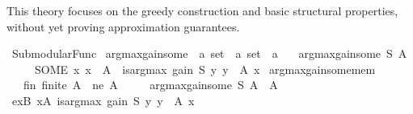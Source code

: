 \begin{isabellebody}
\begin{isamarkuptext}
  This theory focuses on the greedy construction and basic structural
  properties, without yet proving approximation guarantees.%
\end{isamarkuptext}\isamarkuptrue%
%
\isadelimdocument
%
\endisadelimdocument
%
\isatagdocument
%
\isamarkuptrue%
%
\endisatagdocument
{\isafolddocument}%
%
\isadelimdocument
%
\endisadelimdocument
{}\isamarkupfalse%
\ Submodular{\isacharunderscore}{\kern0pt}Func\isanewline
{}\isanewline
\isanewline
{}\isamarkupfalse%
\ argmax{\isacharunderscore}{\kern0pt}gain{\isacharunderscore}{\kern0pt}some\ {\isacharcolon}{\kern0pt}{\isacharcolon}{\kern0pt}\ {\isachardoublequoteopen}{\isacharprime}{\kern0pt}a\ set\ {\isasymRightarrow}\ {\isacharprime}{\kern0pt}a\ set\ {\isasymRightarrow}\ {\isacharprime}{\kern0pt}a{\isachardoublequoteclose}\ \isanewline
\ \ {\isachardoublequoteopen}argmax{\isacharunderscore}{\kern0pt}gain{\isacharunderscore}{\kern0pt}some\ S\ A\ {\isacharequal}{\kern0pt}\isanewline
\ \ \ \ \ {\isacharparenleft}{\kern0pt}SOME\ x{\isachardot}{\kern0pt}\ x\ {\isasymin}\ A\ {\isasymand}\ is{\isacharunderscore}{\kern0pt}arg{\isacharunderscore}{\kern0pt}max\ {\isacharparenleft}{\kern0pt}gain\ S{\isacharparenright}{\kern0pt}\ {\isacharparenleft}{\kern0pt}{\isasymlambda}y{\isachardot}{\kern0pt}\ y\ {\isasymin}\ A{\isacharparenright}{\kern0pt}\ x{\isacharparenright}{\kern0pt}{\isachardoublequoteclose}\isanewline
\isanewline
{}\isamarkupfalse%
\ argmax{\isacharunderscore}{\kern0pt}gain{\isacharunderscore}{\kern0pt}some{\isacharunderscore}{\kern0pt}mem{\isacharcolon}{\kern0pt}\isanewline
\ \ \ fin{\isacharcolon}{\kern0pt}\ {\isachardoublequoteopen}finite\ A{\isachardoublequoteclose}\ \ ne{\isacharcolon}{\kern0pt}\ {\isachardoublequoteopen}A\ {\isasymnoteq}\ {\isacharbraceleft}{\kern0pt}{\isacharbraceright}{\kern0pt}{\isachardoublequoteclose}\isanewline
\ \ \ {\isachardoublequoteopen}argmax{\isacharunderscore}{\kern0pt}gain{\isacharunderscore}{\kern0pt}some\ S\ A\ {\isasymin}\ A{\isachardoublequoteclose}\isanewline
%
\isadelimproof
%
\endisadelimproof
%
\isatagproof
{}\isamarkupfalse%
\ {\isacharminus}{\kern0pt}\isanewline
\ \ \isamarkupfalse%
\ exB{\isacharcolon}{\kern0pt}\ {\isachardoublequoteopen}{\isasymexists}x{\isasymin}A{\isachardot}{\kern0pt}\ is{\isacharunderscore}{\kern0pt}arg{\isacharunderscore}{\kern0pt}max\ {\isacharparenleft}{\kern0pt}gain\ S{\isacharparenright}{\kern0pt}\ {\isacharparenleft}{\kern0pt}{\isasymlambda}y{\isachardot}{\kern0pt}\ y\ {\isasymin}\ A{\isacharparenright}{\kern0pt}\ x{\isachardoublequoteclose}\isanewline

\end{isabellebody}
